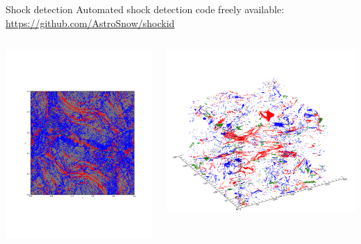 \documentclass[10pt,aspectratio=169,usenames,dvipsnames]{beamer}
\begin{document}
\begin{frame}{Shock detection}
Automated shock detection code freely available: \url{https://github.com/AstroSnow/shockid}
\begin{columns}
\begin{column}{0.5\textwidth}
\includegraphics[width=0.95\linewidth,clip=true,trim=1.0cm 6.0cm 2.5cm 6.0cm]{2023AAPPS-DPP/Figures/hrplasmoid_all.jpg}
\end{column}
\begin{column}{0.5\textwidth}
\includegraphics[width=0.95\linewidth,clip=true,trim=1.0cm 2.0cm 2.5cm 2.0cm]{2023AAPPS-DPP/Figures/test3d2_t10.png}
\end{column}
\end{columns}
\end{frame}
\end{document}
